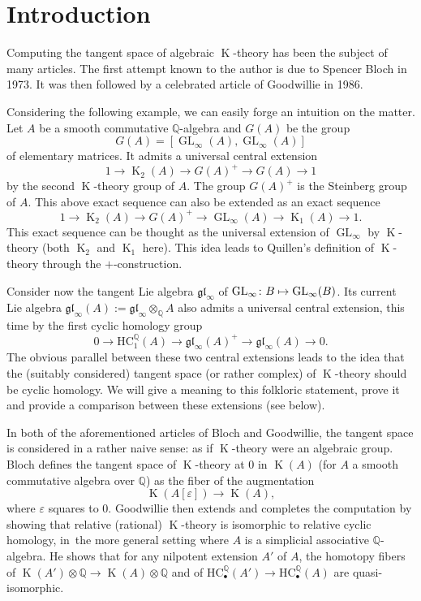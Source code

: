 \documentclass[JEP,XML,SOM,Unicode,NoEqCountersInSection]{cedram}
\newcommand\mto{\mathchoice{\longmapsto}{\mapsto}{\mapsto}{\mapsto}}
\newcommand{\sbullet}{{\scriptscriptstyle\bullet}}
\theoremstyle{definition}
\newcommand{\Q}{\mathbb{Q}}
\DeclareMathOperator{\K}{K}
\newcommand{\gl}{\mathfrak{gl}}
\newcommand{\GL}{\operatorname{GL}}
\newcommand{\HC}{\mathrm{HC}}
\begin{document}
\section*{Introduction}

Computing the tangent space of algebraic $\K$-theory has been the subject of many articles. The first attempt known to the author is due to Spencer Bloch \cite{bloch:tangentk} in 1973. It was then followed by a celebrated article of Goodwillie \cite{goodwillie:tangentk} in 1986.

Considering the following example, we can easily forge an intuition on the matter. Let $A$ be a smooth commutative $\Q$-algebra and $G(A)$ be the group
\[
G(A) = [\GL_\infty(A),\GL_\infty(A)]
\]
of elementary matrices. It admits a universal central extension
\[
1 \to \K_2(A) \to G(A)^+ \to G(A) \to 1
\]
by the second $\K$-theory group of $A$. The group $G(A)^+$ is the Steinberg group of $A$. This above exact sequence can also be extended as an exact sequence
\begin{equation}\label{eq:steinberg}
1 \to \K_2(A) \to G(A)^+ \to \GL_\infty(A) \to \K_1(A) \to 1.
\end{equation}
This exact sequence can be thought as the universal extension of $\GL_\infty$ by $\K$-theory (both $\K_2$ and $\K_1$ here). This idea leads to Quillen's definition of $\K$-theory through the $+$-construction.

Consider now the tangent Lie algebra $\gl_\infty$ of $\GL_\infty \colon B \mto \GL_\infty(B)$. Its current Lie algebra $\gl_\infty(A) := \gl_\infty \otimes_\Q A$ also admits a universal central extension, this time by the first cyclic homology group
\begin{equation} \label{eq:LQTextension}
0 \to \HC_1^\Q(A) \to \gl_\infty(A)^+ \to \gl_\infty(A) \to 0.
\end{equation}
The obvious parallel between these two central extensions leads to the idea that the (suitably considered) tangent space (or rather complex) of $\K$-theory should be cyclic homology. We will give a meaning to this folkloric statement, prove it and provide a comparison between these extensions (see below).

In both of the aforementioned articles of Bloch and Goodwillie, the tangent space is considered in a rather naive sense: as if $\K$-theory were an algebraic group. Bloch defines the tangent space of $\K$-theory at $0$ in $\K(A)$ (for $A$ a smooth commutative algebra over $\Q$) as the fiber of the augmentation
\[
\K(A[\varepsilon]) \to \K(A),
\]
where $\varepsilon$ squares to $0$. Goodwillie then extends and completes the computation by showing that relative (rational) $\K$-theory is isomorphic to relative cyclic homology, in~the more general setting where $A$ is a simplicial associative $\Q$-algebra. He shows that for any nilpotent extension $A'$ of $A$, the homotopy fibers of $\K(A') \otimes \Q \to \K(A) \otimes \Q$ and of $\HC^\Q_\sbullet(A') \to \HC^\Q_\sbullet(A)$ are quasi-isomorphic.
\end{document}
